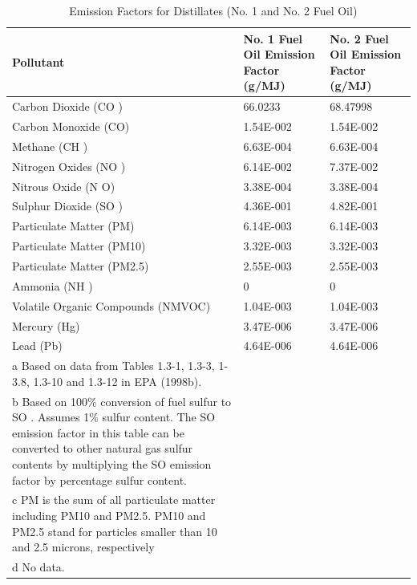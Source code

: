 \begin{longtable}[c]{p{3.0in}p{1.5in}p{1.5in}}
\caption{  Emission Factors for Distillates (No. 1 and No. 2 Fuel Oil) \protect \label{table:emission-factors-for-distillates-no.-1}}\\
\toprule 
Pollutant & No. 1 Fuel Oil Emission Factor   (g/MJ) & No. 2 Fuel Oil Emission Factor   (g/MJ) \tabularnewline \midrule
\endhead
Carbon Dioxide (CO  ) & 66.0233 & 68.47998 \tabularnewline
Carbon Monoxide (CO) & 1.54E-002 & 1.54E-002 \tabularnewline
Methane (CH  ) & 6.63E-004 & 6.63E-004 \tabularnewline
Nitrogen Oxides (NO  ) & 6.14E-002 & 7.37E-002 \tabularnewline
Nitrous Oxide (N  O) & 3.38E-004 & 3.38E-004 \tabularnewline
Sulphur Dioxide (SO  ) & 4.36E-001 & 4.82E-001 \tabularnewline
Particulate Matter (PM) & 6.14E-003 & 6.14E-003 \tabularnewline
Particulate Matter (PM10) & 3.32E-003 & 3.32E-003 \tabularnewline
Particulate Matter (PM2.5) & 2.55E-003 & 2.55E-003 \tabularnewline
Ammonia (NH  ) & 0 & 0 \tabularnewline
Volatile Organic Compounds (NMVOC) & 1.04E-003 & 1.04E-003 \tabularnewline
Mercury (Hg) & 3.47E-006 & 3.47E-006 \tabularnewline
Lead (Pb) & 4.64E-006 & 4.64E-006 \tabularnewline
a Based on data from Tables 1.3-1, 1.3-3, 1-3.8, 1.3-10 and 1.3-12 in EPA (1998b). &  &  \tabularnewline
b Based on 100\% conversion of fuel sulfur to SO  . Assumes 1\% sulfur content. The SO   emission factor in this table can be converted to other natural gas sulfur contents by multiplying the SO   emission factor by percentage sulfur content. &  &  \tabularnewline
c PM is the sum of all particulate matter including PM10 and PM2.5. PM10 and PM2.5 stand for particles smaller than 10 and 2.5 microns, respectively &  &  \tabularnewline
d No data. &  &  \tabularnewline
\bottomrule
\end{longtable}

